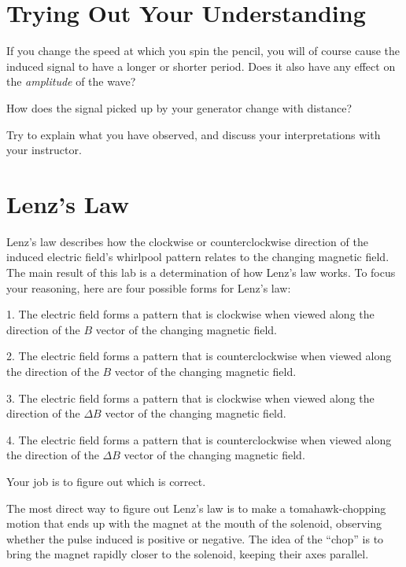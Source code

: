 \section*{Trying Out Your Understanding}


If you change the speed at which you spin the pencil, you
will of course cause the induced signal to have a longer or
shorter period. Does it also have any effect on the
\emph{amplitude} of the wave?


How does the signal picked up by your generator change with distance?

Try to explain what you have observed, and discuss your
interpretations with your instructor.

\section*{Lenz's Law}

Lenz's law describes how the clockwise or counterclockwise
direction of the induced electric field's whirl\-pool pattern
relates to the changing magnetic field. The main result of
this lab is a determination of how Lenz's law works. To
focus your reasoning, here are four possible forms for Lenz's law:

1. The electric field forms a pattern that is clockwise when
viewed along the direction of the $B$ vector of the
changing magnetic field.

2. The electric field forms a pattern that is counterclockwise
when viewed along the direction of the $B$ vector of the
changing magnetic field.

3. The electric field forms a pattern that is clockwise when
viewed along the direction of the $\Delta B$ vector of the
changing magnetic field.

4. The electric field forms a pattern that is counterclockwise
when viewed along the direction of the $\Delta B$ vector of
the changing magnetic field.

Your job is to figure out which is correct.

The most direct way to figure out Lenz's law is to 
make a tomahawk-chopping motion that ends up with the magnet at the mouth of the solenoid,
observing whether the pulse induced is positive or negative.
The idea of the ``chop'' is to bring the magnet rapidly closer
to the solenoid, keeping their axes parallel.

